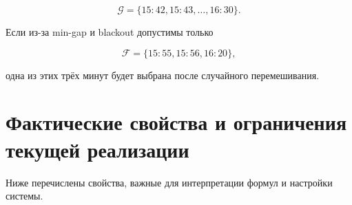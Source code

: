 \documentclass[12pt,a4paper]{article}
\begin{document}
\begin{equation}
  \mathcal{G}=\{15{:}42,15{:}43,\ldots,16{:}30\}.
\end{equation}

Если из-за min-gap и blackout допустимы только

\begin{equation}
  \mathcal{F}=\{15{:}55,15{:}56,16{:}20\},
\end{equation}

одна из этих трёх минут будет выбрана после случайного перемешивания.

\section{Фактические свойства и ограничения текущей реализации}

Ниже перечислены свойства, важные для интерпретации формул и настройки системы.
\end{document}
